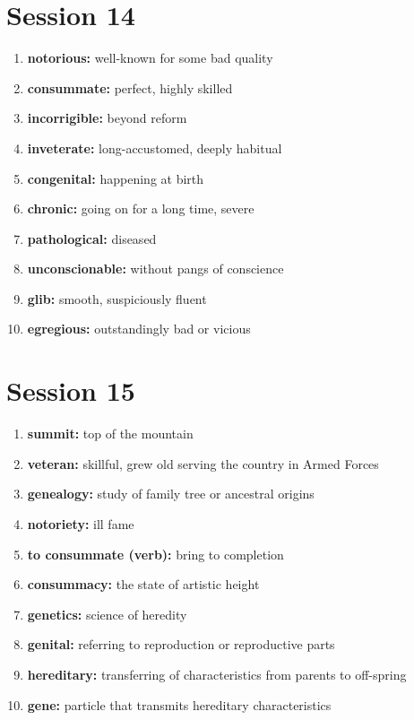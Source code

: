 \documentclass{article}
\begin{document}
\section{Session 14}
\begin{enumerate}
    \item \textbf{notorious: }{well-known for some bad quality}
    \item \textbf{consummate: }{perfect, highly skilled}
    \item \textbf{incorrigible: }{beyond reform}
    \item \textbf{inveterate: }{long-accustomed, deeply habitual}
    \item \textbf{congenital: }{happening at birth}
    \item \textbf{chronic: }{going on for a long time, severe}
    \item \textbf{pathological: }{diseased}
    \item \textbf{unconscionable: }{without pangs of conscience}
    \item \textbf{glib: }{smooth, suspiciously fluent}
    \item \textbf{egregious: }{outstandingly bad or vicious}
    
\end{enumerate}

\section{Session 15}
\begin{enumerate}
    \item \textbf{summit: }{top of the mountain}
    \item \textbf{veteran: }{skillful, grew old serving the country in Armed Forces}
    \item \textbf{genealogy: }{study of family tree or ancestral origins}
    \item \textbf{notoriety: }{ill fame}
    \item \textbf{to consummate (verb): }{bring to completion}
    \item \textbf{consummacy: }{the state of artistic height}
    \item \textbf{genetics: }{science of heredity}
    \item \textbf{genital: }{referring to reproduction or reproductive parts}
    \item \textbf{hereditary: }{transferring of characteristics from parents to off-spring}
    \item \textbf{gene: }{particle that transmits hereditary characteristics}
    
\end{enumerate}
\end{document}
